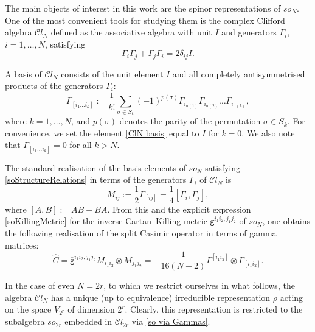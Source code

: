 \documentclass[a4paper]{article}
\newcommand{\Cl}{\mathcal{C}l}
\newcommand{\hC}{\widehat{C}}
\renewcommand{\=}{\ =\ }
\newcommand{\okg}{\overline{\mathsf{g}}}
\numberwithin{equation}{section}
\theoremstyle{remark}
\begin{document}
The main objects of interest in this work are the spinor representations of $so_N$.
One of the most convenient tools for studying them is the complex Clifford algebra $\Cl_N$ defined as the associative algebra with unit $I$ and generators $\Gamma_i$, $i=1,\dots,N$, satisfying
\begin{equation}\label{Clifford generators identities}
\Gamma_i\Gamma_j+\Gamma_j\Gamma_i
=
2\delta_{ij}I.
\end{equation}

A basis of $\Cl_N$ consists of the unit element $I$ and all completely antisymmetrised products of the generators $\Gamma_i$:
\begin{equation}\label{ClN basis}
\Gamma_{[i_1\dots i_k]} := \frac{1}{k!} \sum_{\sigma\in S_k} (-1)^{p(\sigma)} \Gamma_{i_{\sigma(1)}} \Gamma_{i_{\sigma(2)}} \dots \Gamma_{i_{\sigma(k)}},
\end{equation}
where $k=1,\dots,N$, and $p(\sigma)$ denotes the parity of the permutation $\sigma\in S_k$.
For convenience, we set the element \eqref{ClN basis} equal to $I$ for $k=0$.
We also note that $\Gamma_{[i_1\dots i_k]}=0$ for all $k>N$.

The standard realisation of the basis elements of $so_N$ satisfying \eqref{soStructureRelations} in terms of the generators $\Gamma_i$ of $\Cl_N$ is
\begin{equation}\label{so via Gammas}
M_{ij}:=\frac{1}{2}\Gamma_{[ij]}=\frac{1}{4}[\Gamma_i,\Gamma_j],
\end{equation}
where $[A,B]:=AB-BA$. From this and the explicit expression \eqref{soKillingMetric} for the inverse
Cartan--Killing metric $\okg^{i_1i_2,j_1j_2}$ of $so_N$, one obtains the following realisation of the split Casimir operator in terms of gamma matrices:
\begin{equation}\label{hC via Gammas}
\hC = \okg^{i_1i_2,j_1j_2} M_{i_1i_2}\otimes M_{j_1j_2} = -\frac{1}{16(N-2)} \Gamma^{[i_1i_2]}\otimes \Gamma_{[i_1i_2]}.
\end{equation}

In the case of even $N=2r$, to which we restrict ourselves in what follows,
the algebra $\Cl_N$ has a unique (up to equivalence) irreducible representation
$\rho$ acting on the space $V_{2^r}$ of dimension $2^r$. Clearly, this representation is restricted to the subalgebra $so_{2r}$ embedded in $\Cl_{2r}$ via \eqref{so via Gammas}.
\end{document}
